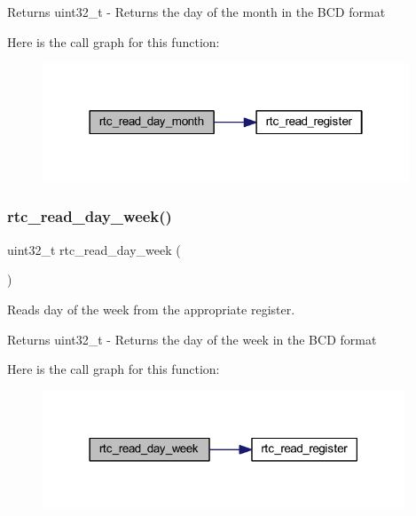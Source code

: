 \begin{DoxyReturn}{Returns}
uint32\+\_\+t -\/ Returns the day of the month in the B\+CD format 
\end{DoxyReturn}
Here is the call graph for this function\+:
\nopagebreak
\begin{figure}[H]
\begin{center}
\leavevmode
\includegraphics[width=310pt]{group__rtc_ga59359f9460af7b7dce7a2c8dc9d98211_cgraph}
\end{center}
\end{figure}
\mbox{\label{group__rtc_ga2e585f34d69246a60a1db0e94ca09c05}} 
\subsubsection{\texorpdfstring{rtc\+\_\+read\+\_\+day\+\_\+week()}{rtc\_read\_day\_week()}}
{\footnotesize\ttfamily uint32\+\_\+t rtc\+\_\+read\+\_\+day\+\_\+week (\begin{DoxyParamCaption}{ }\end{DoxyParamCaption})}



Reads day of the week from the appropriate register. 

\begin{DoxyReturn}{Returns}
uint32\+\_\+t -\/ Returns the day of the week in the B\+CD format 
\end{DoxyReturn}
Here is the call graph for this function\+:
\nopagebreak
\begin{figure}[H]
\begin{center}
\leavevmode
\includegraphics[width=306pt]{group__rtc_ga2e585f34d69246a60a1db0e94ca09c05_cgraph}
\end{center}
\end{figure}
\mbox{\label{group__rtc_ga512adcbde067ca5bb83b1af0e0a7a444}} 
